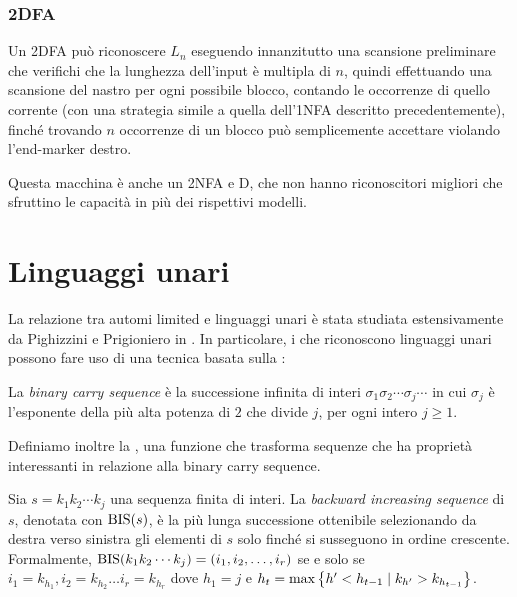 \subsubsection{2DFA}
Un 2DFA può riconoscere $L_n$ eseguendo innanzitutto una scansione preliminare che verifichi che la lunghezza dell'input è multipla di $n$, quindi effettuando una scansione del nastro per ogni possibile blocco, contando le occorrenze di quello corrente (con una strategia simile a quella dell'1NFA descritto precedentemente), finché trovando $n$ occorrenze di un blocco può semplicemente accettare violando l'end-marker destro.

Questa macchina è anche un 2NFA e D, che non hanno riconoscitori migliori che sfruttino le capacità in più dei rispettivi modelli.



\section{Linguaggi unari}\label{sec:wit:un}
La relazione tra automi limited e linguaggi unari è stata studiata estensivamente da Pighizzini e Prigioniero in \cite{Pighizzini:19:limitedunary}. In particolare, i  che riconoscono linguaggi unari possono fare uso di una tecnica basata sulla :
\begin{defin}
	La \emph{binary carry sequence} è la successione infinita di interi $\sigma_1\sigma_2\cdots\sigma_j\cdots$ in cui $\sigma_j$ è l'esponente della più alta potenza di $2$ che divide $j$, per ogni intero $j\geq1$.
\end{defin}

Definiamo inoltre la , una funzione che trasforma sequenze che ha proprietà interessanti in relazione alla binary carry sequence.
\begin{defin}
	Sia $s=k_1k_2\cdots k_j$ una sequenza finita di interi. La \emph{backward increasing sequence} di $s$, denotata con $\mathrm{BIS}(s)$, è la più lunga successione ottenibile selezionando da destra verso sinistra gli elementi di $s$ solo finché si susseguono in ordine crescente. Formalmente, $\mathrm{BIS}(k_1k_2\cdots k_j)=(i_1,i_2,\dots,i_r)$ se e solo se $i_1=k_{h_1},i_2=k_{h_2}\dots i_r=k_{h_r}$ dove $h_1=j$ e $h_t=\max\left\{ h'<h_{t-1}\mid k_{h'}>k_{h_{t-1}} \right\}$.
\end{defin}

